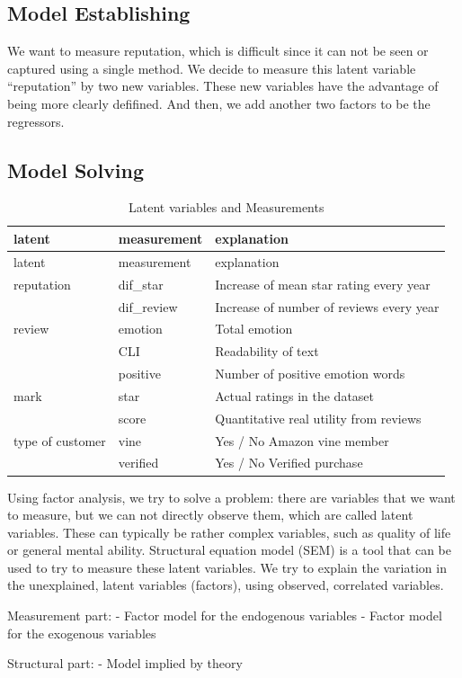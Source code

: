 \documentclass[12pt,a4paper,]{article}
\begin{document}
\hypertarget{model-establishing-3}{%
\subsection{Model Establishing}\label{model-establishing-3}}

We want to measure reputation, which is difficult since it can not be
seen or captured using a single method. We decide to measure this latent
variable ``reputation'' by two new variables. These new variables have
the advantage of being more clearly defifined. And then, we add another
two factors to be the regressors.

\hypertarget{model-solving-2}{%
\subsection{Model Solving}\label{model-solving-2}}

\begin{longtable}[]{@{}lll@{}}
\caption{Latent variables and Measurements}\tabularnewline
\toprule
latent & measurement & explanation\tabularnewline
\midrule
\endfirsthead
\toprule
latent & measurement & explanation\tabularnewline
\midrule
\endhead
reputation & dif\_star & Increase of mean star rating every
year\tabularnewline
& dif\_review & Increase of number of reviews every year\tabularnewline
review & emotion & Total emotion\tabularnewline
& CLI & Readability of text\tabularnewline
& positive & Number of positive emotion words\tabularnewline
mark & star & Actual ratings in the dataset\tabularnewline
& score & Quantitative real utility from reviews\tabularnewline
type of customer & vine & Yes / No Amazon vine member\tabularnewline
& verified & Yes / No Verified purchase\tabularnewline
\bottomrule
\end{longtable}

Using factor analysis, we try to solve a problem: there are variables
that we want to measure, but we can not directly observe them, which are
called latent variables. These can typically be rather complex
variables, such as quality of life or general mental ability. Structural
equation model (SEM) is a tool that can be used to try to measure these
latent variables. We try to explain the variation in the unexplained,
latent variables (factors), using observed, correlated variables.

Measurement part: - Factor model for the endogenous variables - Factor
model for the exogenous variables

Structural part: - Model implied by theory
\end{document}
